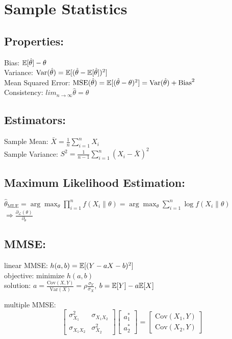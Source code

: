 \section{Sample Statistics}
\subsection{Properties:}
Bias: $\mathbb{E}[\hat{\theta}] - \theta$\\
Variance: $\text{Var}(\hat{\theta}) = \mathbb{E}[(\hat{\theta} - \mathbb{E}[\hat{\theta}])^2]$\\
Mean Squared Error: $\text{MSE}(\hat{\theta}) = \mathbb{E}[(\hat{\theta} - \theta)^2] = 
\text{Var}(\hat{\theta}) + \text{Bias}^2$\\
Consistency: $lim_{n \to \infty} \hat{\theta} = \theta$\\
\subsection{Estimators:}
Sample Mean: $\bar{X} = \frac{1}{n} \sum_{i=1}^{n} X_i$\\
Sample Variance: $S^2 = \frac{1}{n-1} \sum_{i=1}^{n} (X_i - \bar{X})^2$\\
\subsection{Maximum Likelihood Estimation:}
$\hat{\theta}_{\text{MLE}} = \arg \max_{\theta} \prod_{i=1}^{n} f(X_i \| \theta) = \arg \max_{\theta} \sum_{i=1}^{n} \log f(X_i \| \theta)$\\
$\Rightarrow \frac{\partial_{\mathcal{L}}(\theta)}{\partial_\theta}$

\subsection{MMSE:}
linear MMSE: 
$h(a, b) = \mathbb{E}[(Y - aX - b)^2]$\\
objective: minimize $h(a, b)$\\
solution: $a = \frac{\text{Cov}(X, Y)}{\text{Var}(X)} = \rho \frac{\sigma_Y}{\sigma_X}$, $b = \mathbb{E}[Y] - a \mathbb{E}[X]$

multiple MMSE:
\[
\begin{bmatrix}
\sigma_{X_1}^2 & \sigma_{X_1 X_2} \\
\sigma_{X_1 X_2} & \sigma_{X_2}^2
\end{bmatrix}
\begin{bmatrix}
a_1^* \\
a_2^*
\end{bmatrix}
=
\begin{bmatrix}
\mathrm{Cov}(X_1, Y) \\
\mathrm{Cov}(X_2, Y)
\end{bmatrix}
\]

